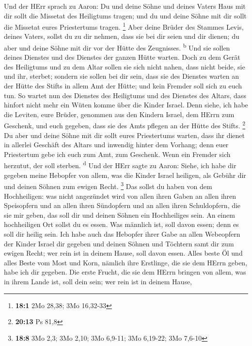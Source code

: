  Und der HErr sprach zu Aaron: Du und deine Söhne und
deines Vaters Haus mit dir sollt die Missetat des Heiligtums tragen; und
du und deine Söhne mit dir sollt die Missetat eures Priestertums tragen.
\footnote{\textbf{18:1} 2Mo 28,38; 3Mo 16,32-33}  Aber
deine Brüder des Stammes Levis, deines Vaters, sollst du zu dir nehmen,
dass sie bei dir seien und dir dienen; du aber und deine Söhne mit dir
vor der Hütte des Zeugnisses. \textsuperscript{b}  Und sie
sollen deines Dienstes und des Dienstes der ganzen Hütte warten. Doch zu
dem Gerät des Heiligtums und zu dem Altar sollen sie sich nicht nahen,
dass nicht beide, sie und ihr, sterbet;  sondern sie
sollen bei dir sein, dass sie des Dienstes warten an der Hütte des
Stifts in allem Amt der Hütte; und kein Fremder soll sich zu euch tun.
 So wartet nun des Dienstes des Heiligtums und des
Dienstes des Altars, dass hinfort nicht mehr ein Wüten komme über die
Kinder Israel.  Denn siehe, ich habe die Leviten, eure
Brüder, genommen aus den Kindern Israel, dem HErrn zum Geschenk, und
euch gegeben, dass sie des Amts pflegen an der Hütte des Stifts.
\footnote{\textbf{20:13} Ps 81,8}  Du aber und deine Söhne
mit dir sollt eures Priestertums warten, dass ihr dienet in allerlei
Geschäft des Altars und inwendig hinter dem Vorhang; denn euer
Priestertum gebe ich euch zum Amt, zum Geschenk. Wenn ein Fremder sich
herzutut, der soll sterben. \textsuperscript{d}  Und der
HErr sagte zu Aaron: Siehe, ich habe dir gegeben meine Hebopfer von
allem, was die Kinder Israel heiligen, als Gebühr dir und deinen Söhnen
zum ewigen Recht. \footnote{\textbf{18:8} 3Mo 2,3; 3Mo 2,10; 3Mo 6,9-11;
  3Mo 6,19-22; 3Mo 7,6-10}  Das sollst du haben von dem
Hochheiligen: was nicht angezündet wird von allen ihren Gaben an allen
ihren Speisopfern und an allen ihren Sündopfern und an allen ihren
Schuldopfern, die sie mir geben, das soll dir und deinen Söhnen ein
Hochheiliges sein.  An einem hochheiligen Ort sollst du
es essen. Was männlich ist, soll davon essen; denn es soll dir heilig
sein.  Ich habe auch das Hebopfer ihrer Gabe an allen
Webeopfern der Kinder Israel dir gegeben und deinen Söhnen und Töchtern
samt dir zum ewigen Recht; wer rein ist in deinem Hause, soll davon
essen.  Alles beste Öl und alles Beste vom Most und Korn,
nämlich ihre Erstlinge, die sie dem HErrn geben, habe ich dir gegeben.
 Die erste Frucht, die sie dem HErrn bringen von allem,
was in ihrem Lande ist, soll dein sein; wer rein ist in deinem Hause,
